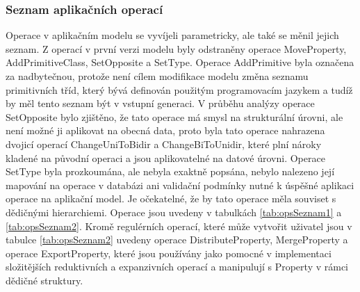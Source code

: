\documentclass[11pt,twoside,a4paper]{book}
\begin{document}
\subsubsection{Seznam aplikačních operací}

Operace v aplikačním modelu se vyvíjeli parametricky, ale také se měnil jejich
seznam. Z operací v první verzi modelu byly odstraněny operace MoveProperty,
AddPrimitiveClass, SetOpposite a SetType. Operace AddPrimitive byla označena za
nadbytečnou, protože není cílem modifikace modelu změna seznamu primitivních tříd, který bývá
definován použitým programovacím jazykem a tudíž by měl tento seznam být v
vstupní generaci. V průběhu analýzy operace SetOpposite bylo zjištěno, že tato
operace má smysl na strukturální úrovni, ale není možné ji aplikovat na obecná
data, proto byla tato operace nahrazena dvojicí operací ChangeUniToBidir a
ChangeBiToUnidir, které plní nároky kladené na původní operaci a jsou
aplikovatelné na datové úrovni. Operace SetType byla prozkoumána, ale
nebyla exaktně popsána, nebylo nalezeno její mapování na operace v databázi ani
validační podmínky nutné k úspěšné aplikaci operace na aplikační model. Je
očekatelné, že by tato operace měla souviset s dědičnými hierarchiemi. Operace
jsou uvedeny v tabulkách \ref{tab:opsSeznam1} a \ref{tab:opsSeznam2}. Kromě regulérních 
operací, které může vytvořit uživatel jsou v tabulce \ref{tab:opsSeznam2} uvedeny operace 
DistributeProperty, MergeProperty a operace ExportProperty, které jsou používány jako pomocné 
v implementaci složitějších reduktivních a expanzivních operací a manipulují s Property v rámci 
dědičné struktury.
\end{document}
